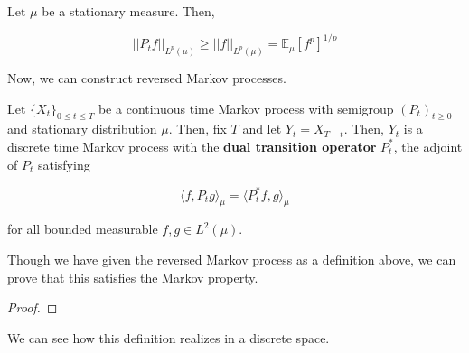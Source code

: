 \documentclass{article}
\begin{document}
      \begin{lemma}
        Let $\mu$ be a stationary measure. Then, 

          \[||P_t f||_{L^p(\mu)} \geq ||f||_{L^p (\mu)} = \mathbb{E}_\mu [f^p]^{1/p}\]
      \end{lemma}

      Now, we can construct reversed Markov processes. 

      \begin{definition}
        Let $\{X_t\}_{0 \leq t \leq T}$ be a continuous time Markov process with semigroup $(P_t)_{t \geq 0}$ and stationary distribution $\mu$. Then, fix $T$ and let $Y_t = X_{T - t}$. Then, $Y_t$ is a discrete time Markov process with the \textbf{dual transition operator} $P_t^*$, the adjoint of $P_t$ satisfying 

          \[\langle f, P_t g \rangle_\mu = \langle P_t^* f, g \rangle_\mu\]

        for all bounded measurable $f, g \in L^2 (\mu)$. 
      \end{definition}

      Though we have given the reversed Markov process as a definition above, we can prove that this satisfies the Markov property. 

      \begin{proof}

      \end{proof}

      We can see how this definition realizes in a discrete space. 
\end{document}
